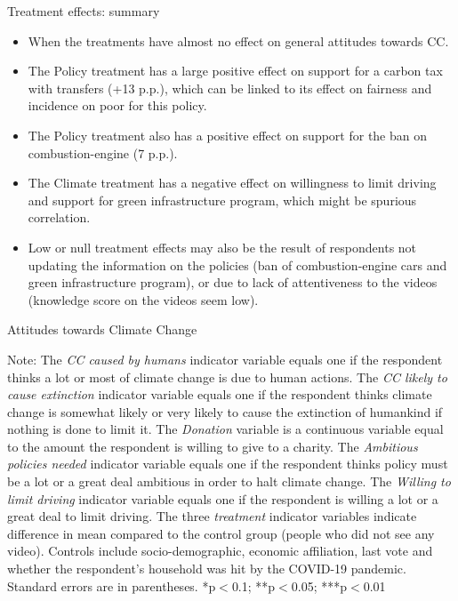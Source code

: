 \documentclass[aspectratio=169,9pt,dvipsnames]{beamer}
\begin{document}
\begin{frame}{Treatment effects: summary}
\begin{itemize}
    \item When the treatments have almost no effect on general attitudes towards CC.
    \item The Policy treatment has a large positive effect on support for a carbon tax with transfers (+13 p.p.), which can be linked to its effect on fairness and incidence on poor for this policy.
    \item The Policy treatment also has a positive effect on support for the ban on combustion-engine (7 p.p.).
    \item The Climate treatment has a negative effect on willingness to limit driving and support for green infrastructure program, which might be spurious correlation.
    \item Low or null treatment effects may also be the result of respondents not updating the information on the policies (ban of combustion-engine cars and green infrastructure program), or due to lack of attentiveness to the videos (knowledge score on the videos seem low). 
\end{itemize}
\end{frame}

\begin{frame}{}%
\begin{table}[h!]
\caption{Attitudes towards Climate Change}
\begin{center}
\scalebox{.59}{}
\end{center}
	{\tiny Note: The \textit{CC caused by humans} indicator variable equals one if the respondent thinks a lot or most of climate change is due to human actions. The \textit{CC likely to cause extinction} indicator variable equals one if the respondent thinks climate change is somewhat likely or very likely to cause the extinction of humankind if nothing is done to limit it. The \textit{Donation} variable is a continuous variable equal to the amount the respondent is willing to give to a charity. The \textit{Ambitious policies needed} indicator variable equals one if the respondent thinks policy must be a lot or a great deal ambitious in order to halt climate change. The \textit{Willing to limit driving} indicator variable equals one if the respondent is willing a lot or a great deal to limit driving. The three \textit{treatment} indicator variables indicate difference in mean compared to the control group (people who did not see any video). Controls include socio-demographic, economic affiliation, last vote and whether the respondent's household was hit by the COVID-19 pandemic. Standard errors are in parentheses.  *p$<$0.1; **p$<$0.05; ***p$<$0.01}
\end{table}
\end{frame}
\end{document}
